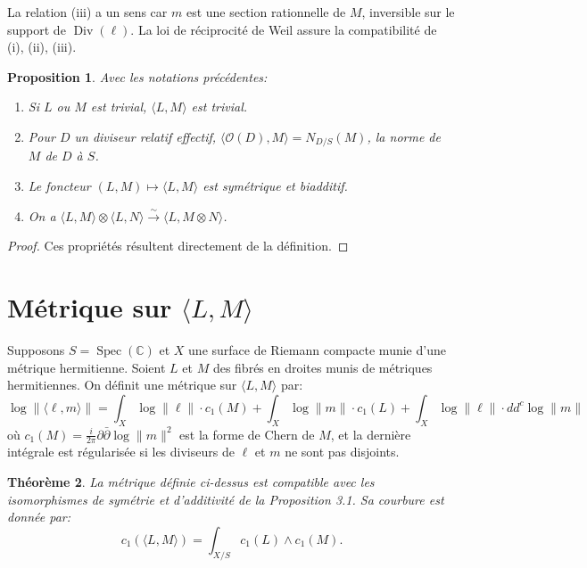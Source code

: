 \documentclass[11pt,a4paper]{article}
\theoremstyle{plain}
\newtheorem{theorem}{Th\'eor\`eme}[section]
\newtheorem{proposition}[theorem]{Proposition}
\theoremstyle{definition}
\DeclareMathOperator{\Spec}{Spec}
\DeclareMathOperator{\Div}{Div}
\newcommand{\C}{\mathbb{C}}
\newcommand{\cO}{\mathcal{O}}
\begin{document}
La relation (iii) a un sens car $m$ est une section rationnelle de $M$, inversible sur le support de $\Div(\ell)$. La loi de r\'eciprocit\'e de Weil assure la compatibilit\'e de (i), (ii), (iii).

\begin{proposition}
Avec les notations pr\'ec\'edentes:
\begin{enumerate}
\item[(i)] Si $L$ ou $M$ est trivial, $\langle L, M \rangle$ est trivial.
\item[(ii)] Pour $D$ un diviseur relatif effectif, $\langle \cO(D), M \rangle = N_{D/S}(M)$, la norme de $M$ de $D$ \`a $S$.
\item[(iii)] Le foncteur $(L, M) \mapsto \langle L, M \rangle$ est sym\'etrique et biadditif.
\item[(iv)] On a $\langle L, M \rangle \otimes \langle L, N \rangle \xrightarrow{\sim} \langle L, M \otimes N \rangle$.
\end{enumerate}
\end{proposition}

\begin{proof}
Ces propri\'et\'es r\'esultent directement de la d\'efinition.
\end{proof}

\section{M\'etrique sur $\langle L, M \rangle$}

Supposons $S = \Spec(\C)$ et $X$ une surface de Riemann compacte munie d'une m\'etrique hermitienne. Soient $L$ et $M$ des fibr\'es en droites munis de m\'etriques hermitiennes. On d\'efinit une m\'etrique sur $\langle L, M \rangle$ par:
\begin{equation}
\log \|\langle \ell, m \rangle\| = \int_X \log \|\ell\| \cdot c_1(M) + \int_X \log \|m\| \cdot c_1(L) + \int_X \log \|\ell\| \cdot dd^c \log \|m\|
\end{equation}
o\`u $c_1(M) = \frac{i}{2\pi} \partial \bar{\partial} \log \|m\|^2$ est la forme de Chern de $M$, et la derni\`ere int\'egrale est r\'egularis\'ee si les diviseurs de $\ell$ et $m$ ne sont pas disjoints.

\begin{theorem}
La m\'etrique d\'efinie ci-dessus est compatible avec les isomorphismes de sym\'etrie et d'additivit\'e de la Proposition 3.1. Sa courbure est donn\'ee par:
\begin{equation}
c_1(\langle L, M \rangle) = \int_{X/S} c_1(L) \wedge c_1(M).
\end{equation}
\end{theorem}
\end{document}

